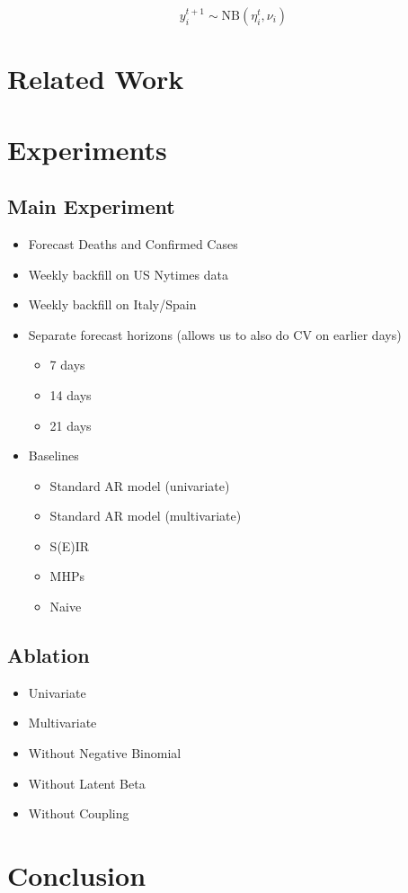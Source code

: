 \documentclass{article}
\begin{document}
\begin{equation*}
    y^{t+1}_{i} \sim \text{NB}(\eta_i^{t}, \nu_i)
\end{equation*}

\section{Related Work}
\label{sec:org513f1fd}

\section{Experiments}
\label{sec:org23dcef3}
\subsection{Main Experiment}
\label{sec:orga5ea523}
\begin{itemize}
\item Forecast Deaths and Confirmed Cases
\item Weekly backfill on US Nytimes data
\item Weekly backfill on Italy/Spain
\item Separate forecast horizons (allows us to also do CV on earlier days)
\begin{itemize}
\item 7 days
\item 14 days
\item 21 days
\end{itemize}
\item Baselines
\begin{itemize}
\item Standard AR model (univariate)
\item Standard AR model (multivariate)
\item S(E)IR
\item MHPs
\item Naive
\end{itemize}
\end{itemize}
\subsection{Ablation}
\label{sec:org3834428}
\begin{itemize}
\item Univariate
\item Multivariate
\item Without Negative Binomial
\item Without Latent Beta
\item Without Coupling
\end{itemize}

\section{Conclusion}
\label{sec:org09e2e2a}
\end{document}
